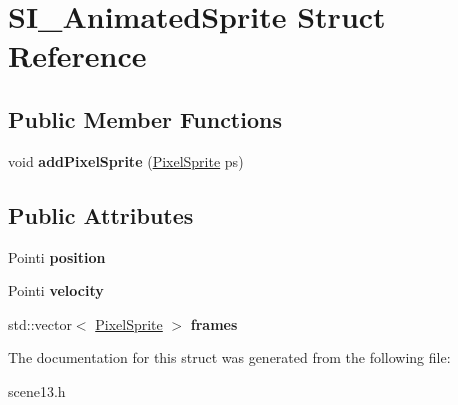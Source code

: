 \hypertarget{struct_s_i___animated_sprite}{}\section{S\+I\+\_\+\+Animated\+Sprite Struct Reference}
\label{struct_s_i___animated_sprite}
\subsection*{Public Member Functions}
\begin{DoxyCompactItemize}
\item 
\mbox{\label{struct_s_i___animated_sprite_aa12ad10e33a06d49e0811de67312b179}} 
void {\bfseries add\+Pixel\+Sprite} (\hyperlink{struct_pixel_sprite}{Pixel\+Sprite} ps)
\end{DoxyCompactItemize}
\subsection*{Public Attributes}
\begin{DoxyCompactItemize}
\item 
\mbox{\label{struct_s_i___animated_sprite_a8d1e4690c159c9d1e12f0588b68abed7}} 
Pointi {\bfseries position}
\item 
\mbox{\label{struct_s_i___animated_sprite_a8951f2a3c0832be05e11f036f3497d12}} 
Pointi {\bfseries velocity}
\item 
\mbox{\label{struct_s_i___animated_sprite_a74dbd660f0abfdd5966617ab65ad7b0d}} 
std\+::vector$<$ \hyperlink{struct_pixel_sprite}{Pixel\+Sprite} $>$ {\bfseries frames}
\end{DoxyCompactItemize}


The documentation for this struct was generated from the following file\+:\begin{DoxyCompactItemize}
\item 
scene13.\+h\end{DoxyCompactItemize}
